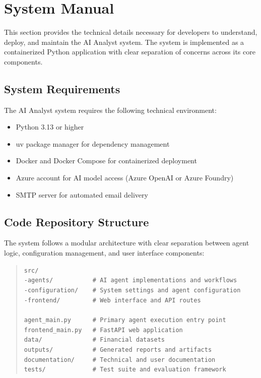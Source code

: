 \documentclass[a4paper]{report}
\begin{document}
\appendix

\printbibliography

\chapter{System Manual}
\label{chapter:system-manual}

This section provides the technical details necessary for developers to understand, deploy, and maintain the AI Analyst system. The system is implemented as a containerized Python application with clear separation of concerns across its core components.

\section{System Requirements}

The AI Analyst system requires the following technical environment:

\begin{itemize}
    \item Python 3.13 or higher
    \item uv package manager for dependency management
    \item Docker and Docker Compose for containerized deployment
    \item Azure account for AI model access (Azure OpenAI or Azure Foundry)
    \item SMTP server for automated email delivery
\end{itemize}

\section{Code Repository Structure}

The system follows a modular architecture with clear separation between agent logic, configuration management, and user interface components:

\begin{quote}
\texttt{src/}\\
\texttt{-agents/~~~~~~~~~~~\# AI agent implementations and workflows}\\
\texttt{-configuration/~~~~\# System settings and agent configuration}\\
\texttt{-frontend/~~~~~~~~~\# Web interface and API routes}\\
\\
\texttt{agent\_main.py~~~~~~\# Primary agent execution entry point}\\
\texttt{frontend\_main.py~~~\# FastAPI web application}\\
\texttt{data/~~~~~~~~~~~~~~\# Financial datasets}\\
\texttt{outputs/~~~~~~~~~~~\# Generated reports and artifacts}\\
\texttt{documentation/~~~~~\# Technical and user documentation}\\
\texttt{tests/~~~~~~~~~~~~~\# Test suite and evaluation framework}
\end{quote}
\end{document}
